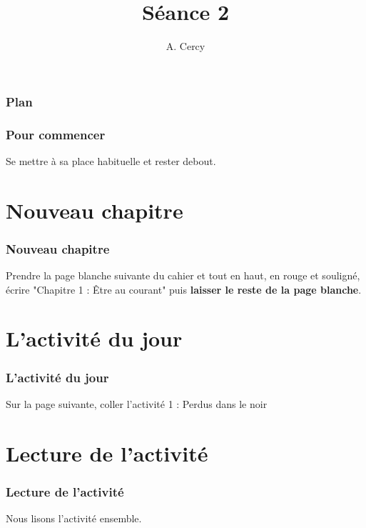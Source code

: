 \documentclass{beamer}
\title[Présentation]{Séance 2} %
\author{A. Cercy} %
\institute[] %
{
Collège Pablo Neruda
}
\date{} %
\begin{document}
\begin{frame}
\titlepage %
\end{frame}

\begin{frame}
\frametitle{Plan} %
\tableofcontents %
\end{frame}

\begin{frame}
    \frametitle{Pour commencer}
    \centerline{Se mettre à sa place habituelle et rester debout.}
\end{frame}


\section{Nouveau chapitre}
\begin{frame}
\frametitle{Nouveau chapitre}
Prendre la page blanche suivante du cahier et tout en haut, en rouge et souligné, écrire "Chapitre 1 : Être au courant" puis \textbf{laisser le reste de la page blanche}.
\end{frame}


\section{L'activité du jour}
\begin{frame}
\frametitle{L'activité du jour}
Sur la page suivante, coller l'activité 1 : Perdus dans le noir
\end{frame}


\section{Lecture de l'activité}
\begin{frame}
\frametitle{Lecture de l'activité}
Nous lisons l'activité ensemble.
\end{frame}
\end{document}
